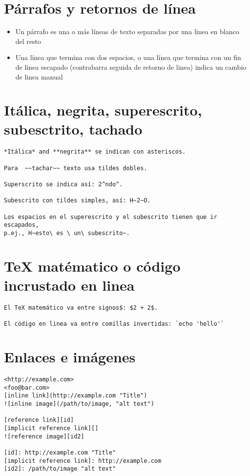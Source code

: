 \documentclass[12pt,spanish,]{article}
\providecommand{\tightlist}{%
  \setlength{\itemsep}{0pt}\setlength{\parskip}{0pt}}
\begin{document}
\section{Párrafos y retornos de
línea}\label{puxe1rrafos-y-retornos-de-luxednea}

\begin{itemize}
\tightlist
\item
  Un párrafo es una o más líneas de texto separadas por una linea en
  blanco del resto
\item
  Una línea que termina con dos espacios, o una línea que termina con un
  fin de linea escapado (contrabarra seguida de retorno de linea) indica
  un cambio de linea manual
\end{itemize}

\section{Itálica, negrita, superescrito, subesctrito,
tachado}\label{ituxe1lica-negrita-superescrito-subesctrito-tachado}

\begin{verbatim}
*Itálica* and **negrita** se indican con asteriscos.

Para  ~~tachar~~ texto usa tildes dobles.

Superscrito se indica así: 2^ndo^.

Subescrito con tildes simples, así: H~2~O.

Los espacios en el superescrito y el subescrito tienen que ir escapados,
p.ej., H~esto\ es \ un\ subescrito~.
\end{verbatim}

\section{TeX matématico o código incrustado en
linea}\label{tex-matuxe9matico-o-cuxf3digo-incrustado-en-linea}

\begin{verbatim}
El TeX matemático va entre signos$: $2 + 2$.

El código en linea va entre comillas invertidas: `echo 'hello'`
\end{verbatim}

\section{Enlaces e imágenes}\label{enlaces-e-imuxe1genes}

\begin{verbatim}
<http://example.com>
<foo@bar.com>
[inline link](http://example.com "Title")
![inline image](/path/to/image, "alt text")

[reference link][id]
[implicit reference link][]
![reference image][id2]

[id]: http://example.com "Title"
[implicit reference link]: http://example.com
[id2]: /path/to/image "alt text"
\end{verbatim}
\end{document}
